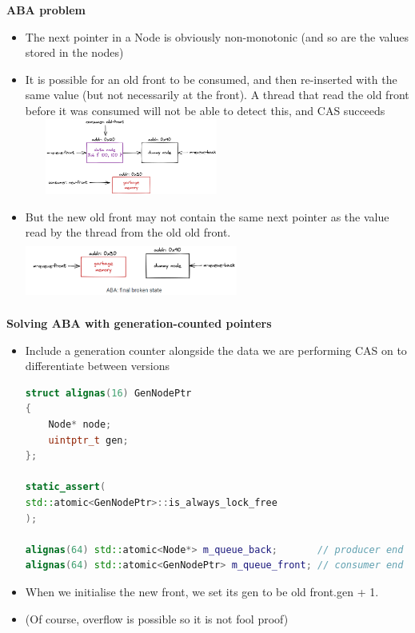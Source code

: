 \documentclass[10pt, landscape]{article}
\begin{document}
\begin{multicols}{4}
\textbf{ABA problem} \\
\begin{itemize}
    \item The next pointer in a Node is obviously non-monotonic (and so are the values stored in the nodes)
    \item It is possible for an old front to be consumed, and then re-inserted with the same value (but not necessarily at the front). A thread that read the old front before it was consumed will not be able to detect this, and CAS succeeds \\
    \includegraphics*[width=7cm, height = 2.5cm]{aba1.png}

    \item But the new old front may not contain the same next pointer as the value read by the thread from the old old front.\\
    \includegraphics*[width=7cm, height =2cm]{aba2.png}
\end{itemize}

\textbf{Solving ABA with generation-counted pointers} \\ 
\begin{itemize}
    \item Include a generation counter alongside the data we are performing CAS on  to differentiate between versions
    \begin{lstlisting}[language=c++,breaklines=true, breakatwhitespace=true]
struct alignas(16) GenNodePtr
{
    Node* node;
    uintptr_t gen;
};

static_assert(
std::atomic<GenNodePtr>::is_always_lock_free
);

alignas(64) std::atomic<Node*> m_queue_back;       // producer end
alignas(64) std::atomic<GenNodePtr> m_queue_front; // consumer end
    \end{lstlisting}
    \item When we initialise the new front, we set its gen to be old front.gen + 1.
    \item (Of course, overflow is possible so it is not fool proof)
\end{itemize}


\end{multicols}
\end{document}
